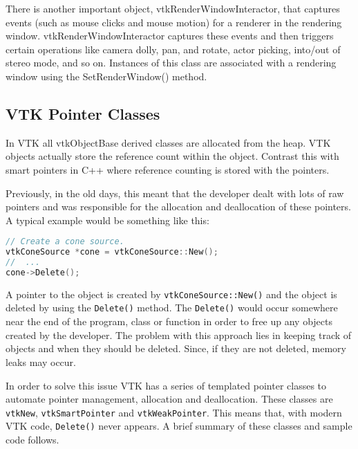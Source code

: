 There is another important object, vtkRenderWindowInteractor, that captures events (such as mouse clicks and mouse motion) for a renderer in the rendering window. vtkRenderWindowInteractor captures these events and then triggers certain operations like camera dolly, pan, and rotate, actor picking, into/out of stereo mode, and so on. Instances of this class are associated with a rendering window using the SetRenderWindow() method.

\subsection{VTK Pointer Classes}

In VTK all vtkObjectBase derived classes are allocated from the heap. VTK objects actually store the reference count within the object. Contrast this with smart pointers in C++ where reference counting is stored with the pointers.

Previously, in the old days, this meant that the developer dealt with lots of raw pointers and was responsible for the allocation and deallocation of these pointers. A typical example would be something like this:
\begin{lstlisting}[language=C++]
// Create a cone source.
vtkConeSource *cone = vtkConeSource::New();
//  ...
cone->Delete();
\end{lstlisting}
A pointer to the object is created by \texttt{vtkConeSource::New()} and the object is deleted by using the \texttt{Delete()} method. The \texttt{Delete()} would occur somewhere near the end of the program, class or function in order to free up any objects created by the developer. The problem with this approach lies in keeping track of objects and when they should be deleted. Since, if they are not deleted, memory leaks may occur.

In order to solve this issue VTK has a series of templated pointer classes to automate pointer management, allocation and deallocation. These classes are \texttt{vtkNew}, \texttt{vtkSmartPointer} and \texttt{vtkWeakPointer}. This means that, with modern VTK code, \texttt{Delete()} never appears. A brief summary of these classes and sample code follows.

